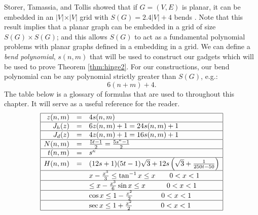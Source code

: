 \documentclass[10pt]{CSUNthesis}
\theoremstyle{plain}%
\theoremstyle{definition}
\theoremstyle{remark}
\newcommand{\lr}[1]{\left( #1 \right)}
\begin{document}
Storer, Tamassia, and Tollis showed that if $G=(V,E)$ is planar, it can be embedded in an $\vert V \vert \times \vert V \vert$ grid with $S(G)=2.4\vert V\vert + 4$ bends \cite{storer1984minimal,tamassia1987efficient}.
Note that this result implies that a planar graph can be embedded in a grid of size $S(G) \times S(G)$; and this allows $S(G)$ to act as a fundamental polynomial problems with planar graphs defined in a embedding in a grid.
We can define a \textit{bend polynomial}, $s(n,m)$ that will be used to construct our gadgets which will be used to prove Theorem \ref{thm:hinge2}.
For our constructions, our bend polynomial can be any polynomial strictly greater than $S(G)$, e.g.:
$$6 (n+m) + 4.$$
The table below is a glossary of formulas that are used to throughout this chapter.
It will serve as a useful reference for the reader.
$$
\begin{array}{|rcl|}
\hline
z(n,m)		&=& 4 s(n,m)\\\hline
J_h (z) 	&=& 6z(n,m)+1 = 24s(n,m)+1 \\\hline
J_d (z) 	&=& 4z(n,m)+1												= 16s(n,m)+1  			\\\hline
N(n,m)		&=& \frac{5t-1}{2}											= \frac{5s^\kappa-1}{2}	\\\hline
t(n,m)		&=& s^\kappa																		\\\hline
H(n,m) 		&=&  (12s+1)  (5t-1)  \sqrt{3} + 12s \lr{\sqrt{3}+ \frac{1}{250t-50}}				\\\hline
&&x - \frac{x^3}{3}\leq\tan^{-1}x\leq x \qquad	 0< x < 1\\\hline
&&\leq x - \frac{x^3}{6}\sin x \leq x \quad\qquad 0< x < 1\\\hline
&&\cos x \leq 1-\frac{x^2}{2} \qquad\qquad 0< x < 1\\\hline
&&\sec x \leq 1+\frac{x^2}{2} \qquad\qquad 0< x < 1\\\hline
\end{array}
$$
\end{document}
